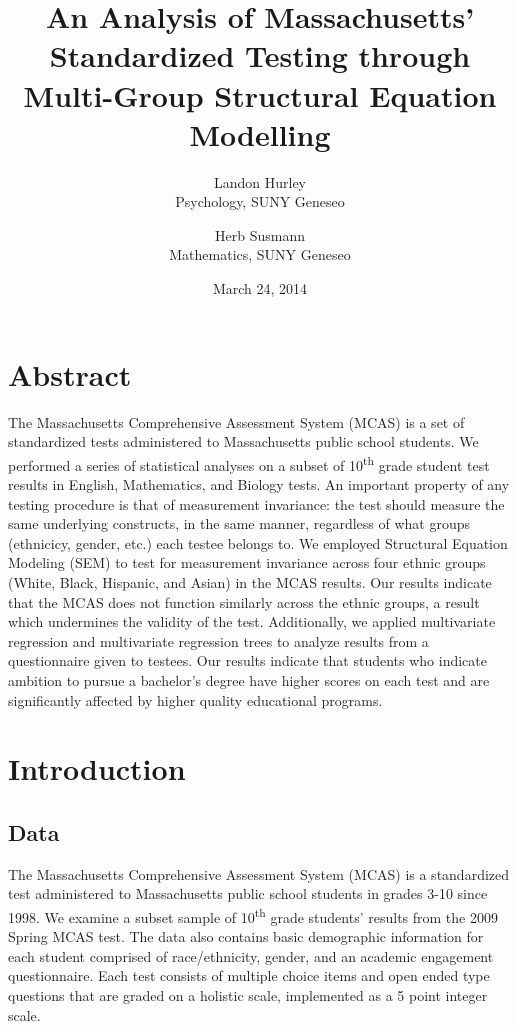 \documentclass{article}\usepackage[]{graphicx}\usepackage[]{color}
\begin{document}
\title{An Analysis of Massachusetts' Standardized Testing through Multi-Group Structural Equation Modelling}
\date{March 24, 2014}
\author{Landon Hurley\\ Psychology, SUNY Geneseo \and Herb Susmann\\ Mathematics, SUNY Geneseo}

\maketitle

\section{Abstract}

The Massachusetts Comprehensive Assessment System (MCAS) is a set of standardized tests administered to Massachusetts public school students. We performed a series of statistical analyses on a subset of 10\textsuperscript{th} grade student test results in English, Mathematics, and Biology tests. An important property of any testing procedure is that of measurement invariance: the test should measure the same underlying constructs, in the same manner, regardless of what groups (ethnicicy, gender, etc.) each testee belongs to. We employed Structural Equation Modeling (SEM) to test for measurement invariance across four ethnic groups (White, Black, Hispanic, and Asian) in the MCAS results. Our results indicate that the MCAS does not function similarly across the ethnic groups, a result which undermines the validity of the test. Additionally, we applied multivariate regression and multivariate regression trees to analyze results from a questionnaire given to testees. Our results indicate that students who indicate ambition to pursue a bachelor's degree have higher scores on each test and are significantly affected by higher quality educational programs.

\section{Introduction}

\subsection{Data}

The Massachusetts Comprehensive Assessment System (MCAS) is a standardized test administered to Massachusetts public school students in grades 3-10 since 1998. We examine a subset sample of 10\textsuperscript{th} grade students' results from the 2009 Spring MCAS test. The data also contains basic demographic information for each student comprised of race/ethnicity, gender, and an academic engagement questionnaire. Each test consists of multiple choice items and open ended type questions that are graded on a holistic scale, implemented as a 5 point integer scale. 
\end{document}
